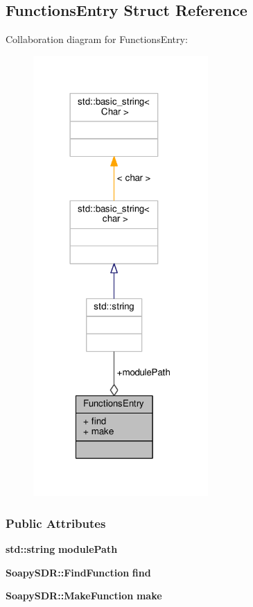 \subsection{Functions\+Entry Struct Reference}
\label{structFunctionsEntry}


Collaboration diagram for Functions\+Entry\+:
\nopagebreak
\begin{figure}[H]
\begin{center}
\leavevmode
\includegraphics[width=189pt]{d9/d38/structFunctionsEntry__coll__graph}
\end{center}
\end{figure}
\subsubsection*{Public Attributes}
\begin{DoxyCompactItemize}
\item 
{\bf std\+::string} {\bf module\+Path}
\item 
{\bf Soapy\+S\+D\+R\+::\+Find\+Function} {\bf find}
\item 
{\bf Soapy\+S\+D\+R\+::\+Make\+Function} {\bf make}
\end{DoxyCompactItemize}


